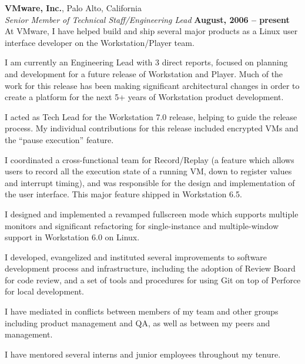 \documentclass[margin,line]{resume}
\begin{document}
\begin{resume}
    {\bf VMware, Inc.}, Palo Alto, California \vspace{2mm}\\\vspace{1mm}%
    {\sl Senior Member of Technical Staff/Engineering Lead} \hfill {\bf August, 2006 -- present}\\
    At VMware, I have helped build and ship several major products as a Linux
    user interface developer on the Workstation/Player team.
    \begin{list2}
    \item I am currently an Engineering Lead with 3 direct reports, focused on
          planning and development for a future release of Workstation and Player.
          Much of the work for this release has been making significant
          architectural changes in order to create a platform for the next 5+
          years of Workstation product development.
    \item I acted as Tech Lead for the Workstation 7.0 release, helping to guide
          the release process. My individual contributions for this release
          included encrypted VMs and the ``pause execution'' feature.
    \item I coordinated a cross-functional team for Record/Replay (a feature
          which allows users to record all the execution state of a running VM,
          down to register values and interrupt timing), and was responsible for
          the design and implementation of the user interface. This major
          feature shipped in Workstation 6.5.
    \item I designed and implemented a revamped fullscreen mode which supports
          multiple monitors and significant refactoring for single-instance and
          multiple-window support in Workstation 6.0 on Linux.
    \item I developed, evangelized and instituted several improvements to
          software development process and infrastructure, including the
          adoption of Review Board for code review, and a set of tools and
          procedures for using Git on top of Perforce for local development.
    \item I have mediated in conflicts between members of my team and other
          groups including product management and QA, as well as between my
          peers and management.
    \item I have mentored several interns and junior employees throughout my
          tenure.
    \end{list2}


\end{resume}
\end{document}
